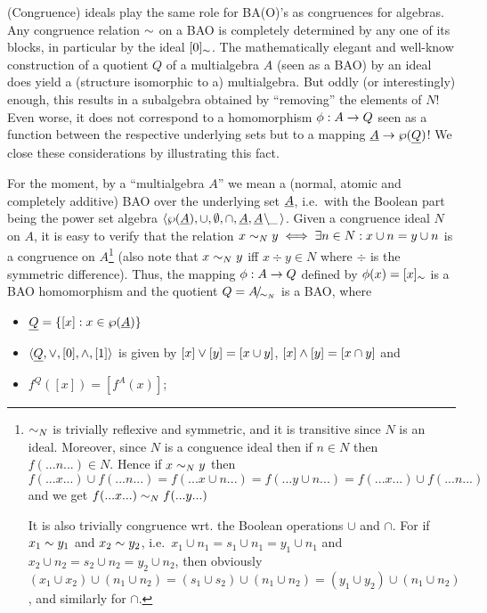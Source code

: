\documentclass[10pt]{article}
\begin{document}
\noindent
(Congruence) ideals play the same role for BA(O)'s as congruences for
algebras. Any congruence relation $\sim$ on a BAO is completely
determined by any one of its blocks, in particular by the ideal
$[0]_\sim$.  The mathematically elegant and well-know construction
of a quotient $Q$ of a multialgebra $A$ (seen as a BAO) by an ideal
does yield a (structure isomorphic to a) multialgebra.  But oddly (or
interestingly) enough, this results in a subalgebra obtained by
``removing'' the elements of $N$!  Even worse, it does not correspond
to a homomorphism $\phi:A\rightarrow Q$ seen as a function between the
respective underlying sets but to a mapping $\underline {A}\rightarrow
\wp(\underline {Q})$!  We close these considerations by illustrating this
fact.

For the moment, by a ``multialgebra $A$'' we mean a (normal, atomic and
completely additive) BAO over the underlying set $\underline {A}$, i.e.\
with the Boolean part being the power set algebra $\langle\wp(\underline {A}),\cup,\emptyset,\cap,\underline {A}, \underline {A}\!\setminus\!\!\_\,\rangle$.  Given a
congruence ideal $N$ on $A$, it is easy to verify that the relation
$x\sim_N y \iff \exists n\in N: x\cup n= y\cup n$ is a congruence on
$A$\footnote{$\sim_N$ is trivially reflexive and symmetric, and it
is transitive since $N$ is an ideal. Moreover, since $N$ is a
conguence ideal then if $n \in N$ then $f(...n...) \in N$. Hence if
$x\sim_N y$ then $f(...x...)\cup f(...n...) = f(...x\cup n...) =  
f(...y\cup n...) = f(...x...)\cup f(...n...)$ and we get $f(...x...)
\sim_N f(...y...)$

It is also trivially congruence wrt. the Boolean operations $\cup$ and
$\cap$. For if $x_1\sim y_1$ and $x_2\sim y_2$, i.e.\ $x_1\cup
n_1=s_1\cup n_1=y_1\cup n_1$ and $x_2\cup n_2=s_2\cup n_2=y_2\cup
n_2$, then obviously $(x_1\cup x_2)\cup (n_1\cup n_2)=(s_1\cup
s_2)\cup (n_1\cup n_2)= (y_1\cup y_2)\cup (n_1\cup n_2)$, and
similarly for $\cap$.}
%
(also note that $x\sim_N y$ iff $x\div y \in N$ where $\div$ is the
symmetric difference). Thus, the mapping $\phi:A\rightarrow Q$ defined by
$\phi(x)= [x]_\sim$ is a BAO homomorphism and the quotient $Q=A\!{\textstyle /}\!_{{\sim_{N}}}$ is a BAO, where
%
\begin{itemize}\MyLPar
\item 
$\underline {Q}=\{[x]:x\in \wp(\underline {A})\}$ 
\item 
$\langle\underline {Q},\lor,[0],\land,[1]\rangle$ is given by
$[x]\lor [y] = [x\cup y]$, $[x]\land[y]=[x\cap y]$ and 
\item 
$f^Q([x])=[f^A(x)]$;
\end{itemize}
\end{document}
